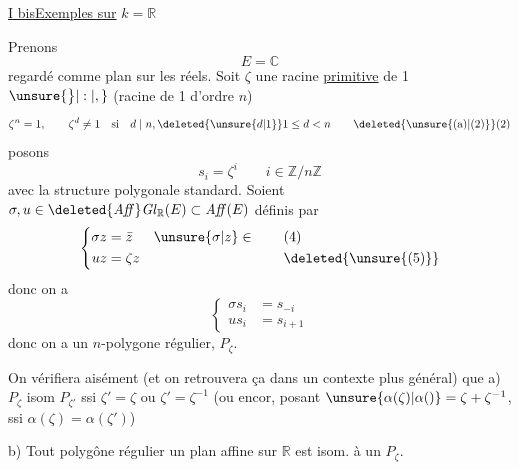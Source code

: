 \uline{I bis}\qquad \uline{Exemples sur} $k=\mathbb{R}$

Prenons
\[
E=\mathbb{C} \tag*{(1)}
\]
regardé comme plan sur les réels. Soit
 $\zeta$ une racine \uline{primitive}  de 1 $\unsure{\big\}|:|,}$
 (racine de 1 d'ordre $n$)
\[
\zeta^n=1,\qquad \zeta^d\ne 1\quad\text{si}\quad d\mid n,\deleted{\unsure{d|1}}1\leq d<n
\tag*{\deleted{\unsure{(a)|(2)}}(2)}
\]
posons
\[
s_i=\zeta^i\qquad i\in\mathbb{Z}/n\mathbb{Z}\tag*{(3)}
\]
avec la structure polygonale  standard.
Soient $\sigma,u\in\deleted{\mathit{Aff}}\mathit{Gl}_{\mathbb{R}}(E)\subset\mathit{Aff}(E)$ définis par
\[
\left\{\begin{aligned}
\sigma z&=\bar z &&\unsure{\sigma|z}\in\\
uz&=\zeta z
\end{aligned}\right.
\tag*{\(\begin{aligned}&\text{(4)}\\&\deleted{\unsure{(5)}}\end{aligned}\)}
\]
donc on a
\[
\left\{\begin{aligned}
\sigma s_i&=s_{-i}\\
us_i&=s_{i+1}
\end{aligned}\right.\tag*{(5)}
\]
donc on a un $n$-polygone régulier, $P_{\zeta}$.

On vérifiera  aisément (et on retrouvera
ça dans un contexte plus général)
que
a) $P_\zeta$ isom  $P_{\zeta'}$ ssi $\zeta'=\zeta$ ou $\zeta'=\zeta^{-1}$
(ou encor, posant $\unsure{\alpha(\zeta)|\alpha()}=\zeta+\zeta^{-1}$, ssi $\alpha(\zeta)=\alpha(\zeta')$)

b) Tout polygône régulier 
un plan affine sur $\mathbb R$ est isom. à un $P_\zeta$.

